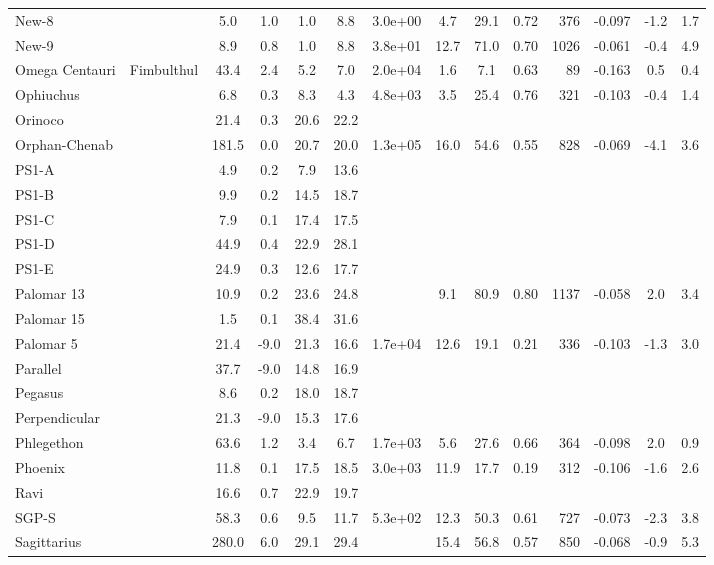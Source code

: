 \begin{tabular}{llSSSSSSSSrSSS}
New-8 &  & 5.0 & 1.0 & 1.0 & 8.8 & 3.0e+00 & 4.7 & 29.1 & 0.72 & 376 & -0.097 & -1.2 & 1.7 \\
New-9 &  & 8.9 & 0.8 & 1.0 & 8.8 & 3.8e+01 & 12.7 & 71.0 & 0.70 & 1026 & -0.061 & -0.4 & 4.9 \\
Omega Centauri & Fimbulthul & 43.4 & 2.4 & 5.2 & 7.0 & 2.0e+04 & 1.6 & 7.1 & 0.63 & 89 & -0.163 & 0.5 & 0.4 \\
Ophiuchus &  & 6.8 & 0.3 & 8.3 & 4.3 & 4.8e+03 & 3.5 & 25.4 & 0.76 & 321 & -0.103 & -0.4 & 1.4 \\
Orinoco &  & 21.4 & 0.3 & 20.6 & 22.2 &  &  &  &  &  &  &  &  \\
Orphan-Chenab &  & 181.5 & 0.0 & 20.7 & 20.0 & 1.3e+05 & 16.0 & 54.6 & 0.55 & 828 & -0.069 & -4.1 & 3.6 \\
PS1-A &  & 4.9 & 0.2 & 7.9 & 13.6 &  &  &  &  &  &  &  &  \\
PS1-B &  & 9.9 & 0.2 & 14.5 & 18.7 &  &  &  &  &  &  &  &  \\
PS1-C &  & 7.9 & 0.1 & 17.4 & 17.5 &  &  &  &  &  &  &  &  \\
PS1-D &  & 44.9 & 0.4 & 22.9 & 28.1 &  &  &  &  &  &  &  &  \\
PS1-E &  & 24.9 & 0.3 & 12.6 & 17.7 &  &  &  &  &  &  &  &  \\
Palomar 13 &  & 10.9 & 0.2 & 23.6 & 24.8 &  & 9.1 & 80.9 & 0.80 & 1137 & -0.058 & 2.0 & 3.4 \\
Palomar 15 &  & 1.5 & 0.1 & 38.4 & 31.6 &  &  &  &  &  &  &  &  \\
Palomar 5 &  & 21.4 & -9.0 & 21.3 & 16.6 & 1.7e+04 & 12.6 & 19.1 & 0.21 & 336 & -0.103 & -1.3 & 3.0 \\
Parallel &  & 37.7 & -9.0 & 14.8 & 16.9 &  &  &  &  &  &  &  &  \\
Pegasus &  & 8.6 & 0.2 & 18.0 & 18.7 &  &  &  &  &  &  &  &  \\
Perpendicular &  & 21.3 & -9.0 & 15.3 & 17.6 &  &  &  &  &  &  &  &  \\
Phlegethon &  & 63.6 & 1.2 & 3.4 & 6.7 & 1.7e+03 & 5.6 & 27.6 & 0.66 & 364 & -0.098 & 2.0 & 0.9 \\
Phoenix &  & 11.8 & 0.1 & 17.5 & 18.5 & 3.0e+03 & 11.9 & 17.7 & 0.19 & 312 & -0.106 & -1.6 & 2.6 \\
Ravi &  & 16.6 & 0.7 & 22.9 & 19.7 &  &  &  &  &  &  &  &  \\
SGP-S &  & 58.3 & 0.6 & 9.5 & 11.7 & 5.3e+02 & 12.3 & 50.3 & 0.61 & 727 & -0.073 & -2.3 & 3.8 \\
Sagittarius &  & 280.0 & 6.0 & 29.1 & 29.4 &  & 15.4 & 56.8 & 0.57 & 850 & -0.068 & -0.9 & 5.3 \\

\end{tabular}
